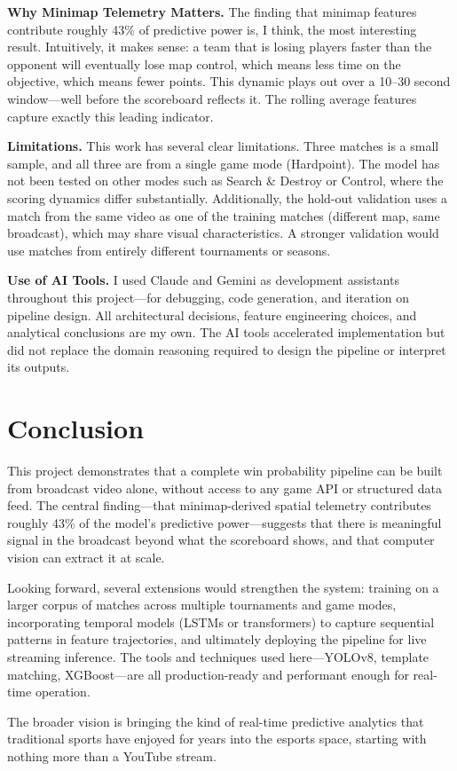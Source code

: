 \documentclass[10pt, twocolumn]{article}
\begin{document}
\textbf{Why Minimap Telemetry Matters.} The finding that minimap features contribute roughly 43\% of predictive power is, I think, the most interesting result. Intuitively, it makes sense: a team that is losing players faster than the opponent will eventually lose map control, which means less time on the objective, which means fewer points. This dynamic plays out over a 10--30 second window---well before the scoreboard reflects it. The rolling average features capture exactly this leading indicator.

\textbf{Limitations.} This work has several clear limitations. Three matches is a small sample, and all three are from a single game mode (Hardpoint). The model has not been tested on other modes such as Search \& Destroy or Control, where the scoring dynamics differ substantially. Additionally, the hold-out validation uses a match from the same video as one of the training matches (different map, same broadcast), which may share visual characteristics. A stronger validation would use matches from entirely different tournaments or seasons.

\textbf{Use of AI Tools.} I used Claude \cite{anthropic2026} and Gemini \cite{google2026} as development assistants throughout this project---for debugging, code generation, and iteration on pipeline design. All architectural decisions, feature engineering choices, and analytical conclusions are my own. The AI tools accelerated implementation but did not replace the domain reasoning required to design the pipeline or interpret its outputs.

\section{Conclusion}

This project demonstrates that a complete win probability pipeline can be built from broadcast video alone, without access to any game API or structured data feed. The central finding---that minimap-derived spatial telemetry contributes roughly 43\% of the model's predictive power---suggests that there is meaningful signal in the broadcast beyond what the scoreboard shows, and that computer vision can extract it at scale.

Looking forward, several extensions would strengthen the system: training on a larger corpus of matches across multiple tournaments and game modes, incorporating temporal models (LSTMs or transformers) to capture sequential patterns in feature trajectories, and ultimately deploying the pipeline for live streaming inference. The tools and techniques used here---YOLOv8, template matching, XGBoost---are all production-ready and performant enough for real-time operation.

The broader vision is bringing the kind of real-time predictive analytics that traditional sports have enjoyed for years into the esports space, starting with nothing more than a YouTube stream.



\end{document}
